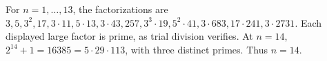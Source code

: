 For $n=1,\ldots,13$, the factorizations are $3,5,3^2,17,3\cdot11,5\cdot13,3\cdot43,257,3^3\cdot19,5^2\cdot41,3\cdot683,17\cdot241,3\cdot2731$. Each displayed large factor is prime, as trial division verifies. At $n=14$, $2^{14}+1=16385=5\cdot29\cdot113$, with three distinct primes. Thus $\boxed{n=14}$.
